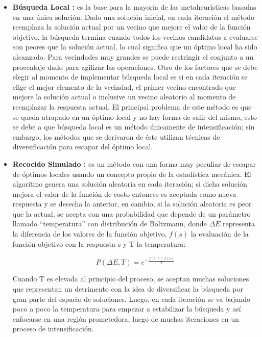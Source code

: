 \begin{itemize}

\item \textbf{Búsqueda Local \cite{talbi2009metaheuristics,aarts2003local}:}
es la base para la mayoría de las metaheurísticas basadas en una única solución. Dado una solución inicial, en cada iteración el método reemplaza la solución actual por un vecino que mejore el valor de la función objetivo, la búsqueda termina cuando todos los vecinos candidatos a evaluarse son peores que la solución actual, lo cual significa que un óptimo local ha sido alcanzado. Para vecindades muy grandes se puede restringir el conjunto a un procentaje dado para agilizar las operaciones. Otro de los factores que se debe elegir al momento de implementar búsqueda local es si en cada iteración se elige el mejor elemento de la vecindad, el primer vecino encontrado que mejore la solución actual o inclusive un vecino aleatorio al momento de reemplazar la respuesta actual. El principal problema de este método es que se queda atrapado en un óptimo local y no hay forma de salir del mismo, esto se debe a que búsqueda local es un método únicamente de intensificación; sin embargo, los métodos que se derivaron de éste utilizan técnicas de diversificación para escapar del óptimo local.

\item \textbf{Recocido Simulado \cite{talbi2009metaheuristics,kirkpatrick1983optimization}:}
es un método con una forma muy peculiar de escapar de óptimos locales usando un concepto propio de la estadística mecánica. El algoritmo genera una solución aleatoria en cada iteración; si dicha solución mejora el valor de la función de costo entonces es aceptada como nueva respuesta y se desecha la anterior, en cambio, si la solución aleatoria es peor que la actual, se acepta con una probabilidad que depende de un parámetro llamado ``temperatura'' con distribución de Boltzmann, donde $\Delta E$ representa la diferencia de los valores de la función objetivo, $f(s)$ la evaluación de la función objetivo con la respuesta s y T la temperatura:

\begin{equation}
P(\Delta E,T) = e^{-\frac{f(s')-f(s)}{T}}
\end{equation} 

Cuando T es elevada al principio del proceso, se aceptan muchas soluciones que representan un detrimento con la idea de diversificar la búsqueda por gran parte del espacio de soluciones. Luego, en cada iteración se va bajando poco a poco la temperatura para empezar a estabilizar la búsqueda y así enfocarse en una región prometedora, luego de muchas iteraciones en un proceso de intensificación. 


\end{itemize}
